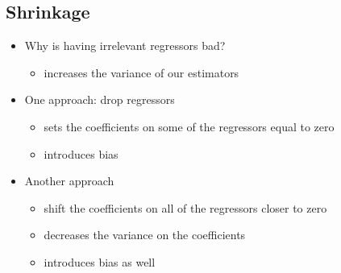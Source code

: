 \subsection{Shrinkage}
\begin{itemize}
\item Why is having irrelevant regressors bad?
\begin{itemize}
\item increases the variance of our estimators
\end{itemize}
\item One approach: drop regressors
\begin{itemize}
\item sets the coefficients on some of the regressors equal to zero
\item introduces bias
\end{itemize}
\item Another approach
\begin{itemize}
\item shift the coefficients on all of the regressors closer to zero
\item decreases the variance on the coefficients
\item introduces bias as well
\end{itemize}
\end{itemize}

